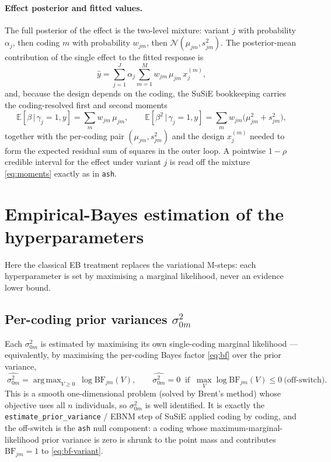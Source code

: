 \documentclass[11pt]{article}
\newcommand{\E}{\mathbb{E}}
\newcommand{\Nor}{\mathcal{N}}
\newcommand{\given}{\,\vert\,}
\newcommand{\sigz}[1]{\sigma_{0#1}^{2}}
\newcommand{\BF}{\mathrm{BF}}
\newcommand{\xjm}{x_j^{(m)}}
\DeclareMathOperator*{\argmax}{arg\,max}
\theoremstyle{plain}
\theoremstyle{remark}
\begin{document}
\paragraph{Effect posterior and fitted values.} The full posterior of the effect
is the two-level mixture: variant $j$ with probability $\alpha_j$, then coding $m$
with probability $w_{jm}$, then $\Nor(\mu_{jm},s_{jm}^{2})$. The posterior-mean
contribution of the single effect to the fitted response is
\begin{equation}\label{eq:fitted}
  \widehat{y}
  =\sum_{j=1}^{J}\alpha_j\sum_{m=1}^{M}w_{jm}\,\mu_{jm}\,\xjm,
\end{equation}
and, because the design depends on the coding, the SuSiE bookkeeping carries the
coding-resolved first and second moments
\begin{equation}\label{eq:moments}
  \E[\beta\given\gamma_j=1,y]=\sum_{m}w_{jm}\,\mu_{jm},
  \qquad
  \E[\beta^{2}\given\gamma_j=1,y]=\sum_{m}w_{jm}\big(\mu_{jm}^{2}+s_{jm}^{2}\big),
\end{equation}
together with the per-coding pair $(\mu_{jm},s_{jm}^{2})$ and the design $\xjm$
needed to form the expected residual sum of squares in the outer loop. A pointwise
$1-\rho$ credible interval for the effect under variant $j$ is read off the
mixture \eqref{eq:moments} exactly as in \texttt{ash}.

\section{Empirical-Bayes estimation of the hyperparameters}\label{sec:eb}

Here the classical EB treatment replaces the variational M-steps: each
hyperparameter is set by maximising a marginal likelihood, never an evidence
lower bound.

\subsection{Per-coding prior variances $\sigz{m}$}
Each $\sigz{m}$ is estimated by maximising its own single-coding marginal
likelihood --- equivalently, by maximising the per-coding Bayes factor
\eqref{eq:bf} over the prior variance,
\begin{equation}\label{eq:ebv}
\boxed{\;
  \widehat{\sigz{m}}=\argmax_{V\ge 0}\ \log\BF_{jm}(V),
  \qquad \widehat{\sigz{m}}=0\ \text{ if }\ \max_{V}\log\BF_{jm}(V)\le 0\ \text{(off-switch)}.
\;}
\end{equation}
This is a smooth one-dimensional problem (solved by Brent's method) whose
objective uses all $n$ individuals, so $\sigz{m}$ is well identified. It is
exactly the \texttt{estimate\_prior\_variance} / EBNM step of SuSiE applied
coding by coding, and the off-switch is the \texttt{ash} null component: a coding
whose maximum-marginal-likelihood prior variance is zero is shrunk to the point
mass and contributes $\BF_{jm}=1$ to \eqref{eq:bf-variant}.
\end{document}
